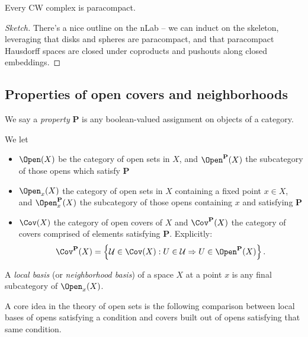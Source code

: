 \documentclass[11pt]{book}
\begin{document}
\begin{theorem}
\label{thm:miyazaki}
Every CW complex is paracompact.
\end{theorem}
\begin{proof}[Sketch] There's a nice outline on the nLab -- we can induct on the skeleton, leveraging that disks and spheres are paracompact, and that paracompact Hausdorff spaces are closed under coproducts and pushouts along closed embeddings.
\end{proof}

\subsection{Properties of open covers and neighborhoods}

We say a \emph{property} $\mathbf{P}$ is any boolean-valued assignment on objects of a category.

\begin{notation} We let
\begin{itemize}
    \item $\Open(X)$ be the category of open sets in $X$, and $\Open^{\mathbf{P}}(X)$ the subcategory of those opens which satisfy $\mathbf{P}$
    \item $\Open_x(X)$ the category of open sets in $X$ containing a fixed point $x\in X$, and $\Open_x^{\mathbf{P}}(X)$ the subcategory of those opens containing $x$ and satisfying $\mathbf{P}$
    \item $\Cov(X)$ the category of open covers of $X$ and $\Cov^{\mathbf{P}}(X)$ the category of covers comprised of elements satisfying \textbf{P}. Explicitly:
    \begin{align*}
        \Cov^{\mathbf{P}}(X) = \left\{ \mathcal{U}\in \Cov(X) : U\in \mathcal{U} \Rightarrow U\in \Open^{\mathbf{P}}(X) \right\}.
    \end{align*}
\end{itemize}
\end{notation}

\begin{terminology} A \emph{local basis} (or \emph{neighborhood basis}) of a space $X$ at a point $x$ is any final subcategory of $\Open_x(X)$.
\end{terminology}

A core idea in the theory of open sets is the following comparison between local bases of opens satisfying a condition and covers built out of opens satisfying that same condition.
\end{document}
